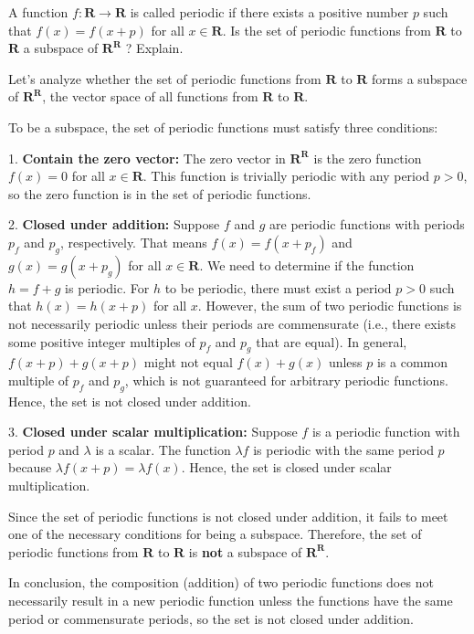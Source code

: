 \begin{exercise}
    A function $f: \mathbf{R} \rightarrow \mathbf{R}$ is called periodic if there exists a positive number $p$ such that $f(x)=f(x+p)$ for all $x \in \mathbf{R}$. Is the set of periodic functions from $\mathbf{R}$ to $\mathbf{R}$ a subspace of $\mathbf{R}^{\mathbf{R}}$ ? Explain.
\end{exercise}
\begin{solution}
Let's analyze whether the set of periodic functions from \(\mathbf{R}\) to \(\mathbf{R}\) forms a subspace of \(\mathbf{R}^{\mathbf{R}} \), the vector space of all functions from \(\mathbf{R}\) to \(\mathbf{R}\).

To be a subspace, the set of periodic functions must satisfy three conditions:

1. \textbf{Contain the zero vector:} The zero vector in \(\mathbf{R}^{\mathbf{R}}\) is the zero function \(f(x) = 0\) for all \(x \in \mathbf{R}\). This function is trivially periodic with any period \(p > 0\), so the zero function is in the set of periodic functions.

2. \textbf{Closed under addition:} Suppose \(f\) and \(g\) are periodic functions with periods \(p_f\) and \(p_g\), respectively. That means \(f(x) = f(x + p_f)\) and \(g(x) = g(x + p_g)\) for all \(x \in \mathbf{R}\). We need to determine if the function \(h = f + g\) is periodic. For \(h\) to be periodic, there must exist a period \(p > 0\) such that \(h(x) = h(x + p)\) for all \(x\). However, the sum of two periodic functions is not necessarily periodic unless their periods are commensurate (i.e., there exists some positive integer multiples of \(p_f\) and \(p_g\) that are equal). In general, \(f(x + p) + g(x + p)\) might not equal \(f(x) + g(x)\) unless \(p\) is a common multiple of \(p_f\) and \(p_g\), which is not guaranteed for arbitrary periodic functions. Hence, the set is not closed under addition.

3. \textbf{Closed under scalar multiplication:} Suppose \(f\) is a periodic function with period \(p\) and \(\lambda\) is a scalar. The function \(\lambda f\) is periodic with the same period \(p\) because \(\lambda f(x + p) = \lambda f(x)\). Hence, the set is closed under scalar multiplication.

Since the set of periodic functions is not closed under addition, it fails to meet one of the necessary conditions for being a subspace. Therefore, the set of periodic functions from \(\mathbf{R}\) to \(\mathbf{R}\) is \textbf{not} a subspace of \(\mathbf{R}^{\mathbf{R}}\).

In conclusion, the composition (addition) of two periodic functions does not necessarily result in a new periodic function unless the functions have the same period or commensurate periods, so the set is not closed under addition.
\end{solution}

